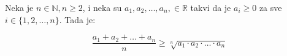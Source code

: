 \documentclass[11pt]{article}
\begin{document}
	\noindent
	Neka je $ n \in \mathbb{N}, n \ge 2 $, i neka su $ a_1, a_2, \ldots, a_n, \in \mathbb{R} $ takvi da
	je $ a_i \ge 0 $ za sve $ i \in \{1, 2, \ldots, n\} $. Tada je:

	\begin{equation*}
		\frac{a_1 + a_2 + \ldots + a_n}{n} \ge \sqrt[n]{a_1 \cdot a_2 \cdot \ldots \cdot a_n}
	\end{equation*}
\end{document}
